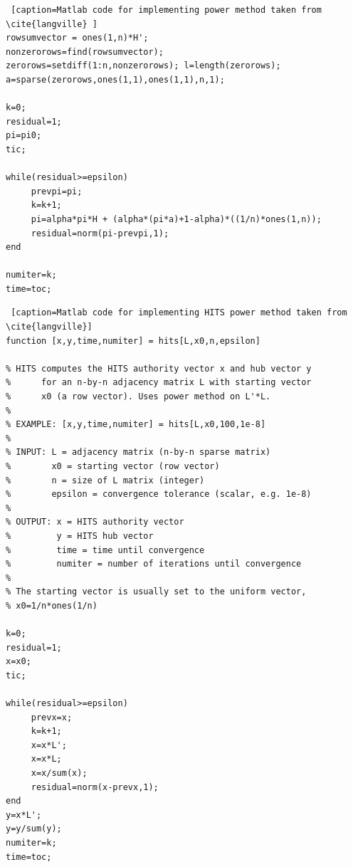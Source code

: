 \documentclass[11pt]{report}
\begin{document}
\begin{appendices}
\begin{lstlisting} [caption=Matlab code for implementing power method taken from \cite{langville} ]
rowsumvector = ones(1,n)*H';
nonzerorows=find(rowsumvector);
zerorows=setdiff(1:n,nonzerorows); l=length(zerorows);
a=sparse(zerorows,ones(1,1),ones(1,1),n,1);

k=0;
residual=1;
pi=pi0;
tic;

while(residual>=epsilon)
     prevpi=pi;
     k=k+1;
     pi=alpha*pi*H + (alpha*(pi*a)+1-alpha)*((1/n)*ones(1,n));
     residual=norm(pi-prevpi,1);
end

numiter=k;
time=toc;

\end{lstlisting}

\begin{lstlisting} [caption=Matlab code for implementing HITS power method taken from \cite{langville}]
function [x,y,time,numiter] = hits[L,x0,n,epsilon] 

% HITS computes the HITS authority vector x and hub vector y 
%      for an n-by-n adjacency matrix L with starting vector
%      x0 (a row vector). Uses power method on L'*L.
%
% EXAMPLE: [x,y,time,numiter] = hits[L,x0,100,1e-8]
%
% INPUT: L = adjacency matrix (n-by-n sparse matrix)
%        x0 = starting vector (row vector)
%        n = size of L matrix (integer)
%        epsilon = convergence tolerance (scalar, e.g. 1e-8)
%
% OUTPUT: x = HITS authority vector
%         y = HITS hub vector
%         time = time until convergence
%         numiter = number of iterations until convergence
%        
% The starting vector is usually set to the uniform vector,
% x0=1/n*ones(1/n)

k=0;
residual=1;
x=x0;
tic;

while(residual>=epsilon)
     prevx=x;
     k=k+1;
     x=x*L';
     x=x*L;
     x=x/sum(x);
     residual=norm(x-prevx,1);
end
y=x*L';
y=y/sum(y);
numiter=k;
time=toc;

\end{lstlisting}
\end{appendices}
\end{document}
